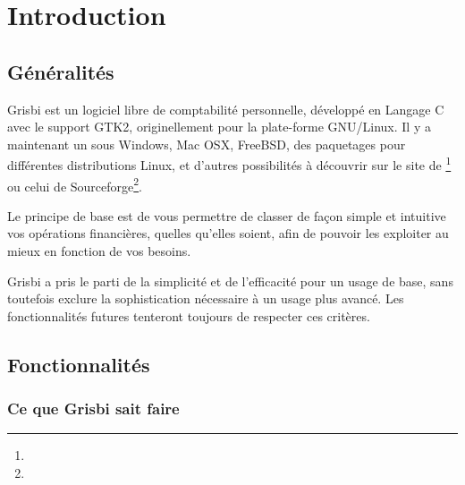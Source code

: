 
\chapter{Introduction\label{introduction}}


\section{Généralités\label{introduction-general}}


Grisbi est un \gls{logiciel libre} de comptabilité personnelle, développé en \gls{Langage C} avec le support \gls{GTK}2, originellement pour la plate-forme \gls{GNU/Linux}. Il y a maintenant un  sous Windows, Mac OSX, FreeBSD, des paquetages pour différentes \gls{distributions Linux}, et d'autres possibilités à découvrir sur le site de \footnote{\urlGrisbi{}} ou celui de {Sourceforge}\footnote{\urlSourceForge{}}.

Le principe de base est de vous permettre de classer de façon simple et intuitive vos opérations financières, quelles qu’elles soient, afin de pouvoir les exploiter au mieux en fonction de vos besoins.

Grisbi a pris le parti de la simplicité et de l'efficacité pour un usage de
base, sans toutefois exclure la sophistication nécessaire à un usage plus avancé. Les fonctionnalités futures tenteront toujours de respecter ces critères.


\section{Fonctionnalités\label{introduction ;-features}}


\subsection{Ce que Grisbi sait faire}


